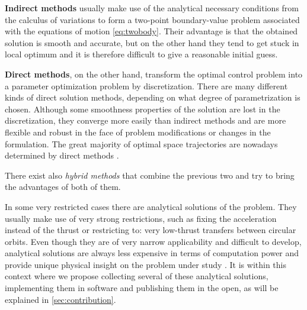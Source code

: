 % 
% 
% 
% 
%
%
\textbf{Indirect methods} usually make use of the analytical necessary conditions from the calculus of variations to form a two-point boundary-value problem associated with the equations of motion \ref{eq:twobody}. Their advantage is that the obtained solution is smooth and accurate, but on the other hand they tend to get stuck in local optimum and it is therefore difficult to give a reasonable initial guess. 
% 
% 

\textbf{Direct methods}, on the other hand, transform the optimal control problem into a parameter optimization problem by discretization. There are many different kinds of direct solution methods, depending on what degree of parametrization is chosen. Although some smoothness properties of the solution are lost in the discretization, they converge more easily than indirect methods and are more flexible and robust in the face of problem modifications or changes in the formulation. The great majority of optimal space trajectories are nowadays determined by direct methods \cite{conway2010spacecraft}.
% 
% 

There exist also \textit{hybrid methods} that combine the previous two and try to bring the advantages of both of them.

In some very restricted cases there are analytical solutions of the problem. They usually make use of very strong restrictions, such as fixing the acceleration instead of the thrust \cite{battin1999introduction} or restricting to: very low-thrust transfers between circular orbits. Even though they are of very narrow applicability and difficult to develop, analytical solutions are always less expensive in terms of computation power and provide unique physical insight on the problem under study \cite{lawden1963optimal}. It is within this context where we propose collecting several of these analytical solutions, implementing them in software and publishing them in the open, as will be explained in \ref{sec:contribution}.
% 
% 

